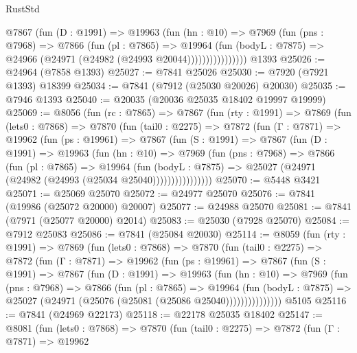 \begin{lexlean}{RustStd}
\begin{coremodule}
                  @7867
                    (fun (D : @1991) =>
                    @19963
                      (fun (hn : @10) =>
                      @7969
                        (fun (pns : @7968) =>
                        @7866
                          (fun (pl : @7865) =>
                          @19964
                            (fun (bodyL : @7875) =>
                            @24966 (@24971 (@24982 (@24993 @20044))))))))))))))))
    @1393
@25026 := @24964 (@7858 @1393)
@25027 := @7841 @25026
@25030 := @7920 (@7921 @1393) @18399
@25034 := @7841 (@7912 (@25030 @20026) @20030)
@25035 := @7946 @1393
@25040 := @20035 (@20036 @25035 @18402 @19997 @19999)
@25069 := @8056
    (fun (rc : @7865) =>
    @7867
      (fun (rty : @1991) =>
      @7869
        (fun (lets0 : @7868) =>
        @7870
          (fun (tail0 : @2275) =>
          @7872
            (fun (Γ : @7871) =>
            @19962
              (fun (ps : @19961) =>
              @7867
                (fun (S : @1991) =>
                @7867
                  (fun (D : @1991) =>
                  @19963
                    (fun (hn : @10) =>
                    @7969
                      (fun (pns : @7968) =>
                      @7866
                        (fun (pl : @7865) =>
                        @19964
                          (fun (bodyL : @7875) =>
                          @25027 (@24971 (@24982 (@24993 (@25034 @25040))))))))))))))))
@25070 := @5448 @3421
@25071 := @25069 @25070
@25072 := @24977 @25070
@25076 := @7841 (@19986 (@25072 @20000) @20007)
@25077 := @24988 @25070
@25081 := @7841 (@7971 (@25077 @20000) @2014)
@25083 := @25030 (@7928 @25070)
@25084 := @7912 @25083
@25086 := @7841 (@25084 @20030)
@25114 := @8059
    (fun (rty : @1991) =>
    @7869
      (fun (lets0 : @7868) =>
      @7870
        (fun (tail0 : @2275) =>
        @7872
          (fun (Γ : @7871) =>
          @19962
            (fun (ps : @19961) =>
            @7867
              (fun (S : @1991) =>
              @7867
                (fun (D : @1991) =>
                @19963
                  (fun (hn : @10) =>
                  @7969
                    (fun (pns : @7968) =>
                    @7866
                      (fun (pl : @7865) =>
                      @19964
                        (fun (bodyL : @7875) =>
                        @25027 (@24971 (@25076 (@25081 (@25086 @25040)))))))))))))))
    @5105
@25116 := @7841 (@24969 @22173)
@25118 := @22178 @25035 @18402
@25147 := @8081
    (fun (lets0 : @7868) =>
    @7870
      (fun (tail0 : @2275) =>
      @7872
        (fun (Γ : @7871) =>
        @19962

\end{coremodule}
\end{lexlean}
